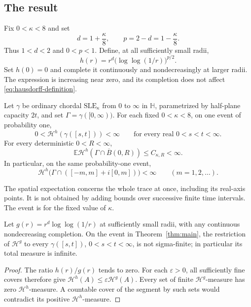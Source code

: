 \subsection{The result}

Fix $0<\kappa<8$ and set
\begin{equation}\label{eq:parameters}
 d=1+\frac\kappa8,\qquad p=2-d=1-\frac\kappa8.
\end{equation}
Thus $1<d<2$ and $0<p<1$. Define, at all sufficiently small radii,
\begin{equation}\label{eq:gauge}
 h(r)=r^d\bigl(\log\log(1/r)\bigr)^{p/2}.
\end{equation}
Set $h(0)=0$ and complete it continuously and nondecreasingly at
larger radii. The expression is increasing near zero, and its
completion does not affect \eqref{eq:hausdorff-definition}.

\begin{theorem}\label{thm:main}
Let $\gamma$ be ordinary chordal $\mathrm{SLE}_\kappa$ from $0$ to
$\infty$ in $\mathbb H$, parametrized by half-plane capacity $2t$,
and set $\Gamma=\gamma([0,\infty))$. For each fixed $0<\kappa<8$,
on one event of probability one,
\[
 0<\mathcal H^h(\gamma([s,t]))<\infty
 \qquad\text{for every real }0<s<t<\infty.
\]
For every deterministic $0<R<\infty$,
\[
 \mathbb E\mathcal H^h(\Gamma\cap\overline B(0,R))
       \le C_{\kappa,R}<\infty.
\]
In particular, on the same probability-one event,
\[
 \mathcal H^h\bigl(\Gamma\cap([-m,m]+i[0,m])\bigr)<\infty
 \qquad(m=1,2,\ldots).
\]
\end{theorem}

The spatial expectation concerns the whole trace at once, including
its real-axis points. It is not obtained by adding bounds over
successive finite time intervals. The event is for the fixed value
of $\kappa$.

\begin{corollary}\label{cor:larger-gauge}
Let $g(r)=r^d\log\log(1/r)$ at sufficiently small radii, with any
continuous nondecreasing completion. On the event in
Theorem~\ref{thm:main}, the restriction of $\mathcal H^g$ to every
$\gamma([s,t])$, $0<s<t<\infty$, is not sigma-finite; in particular
its total measure is infinite.
\end{corollary}
\begin{proof}
The ratio $h(r)/g(r)$ tends to zero. For each $\varepsilon>0$,
all sufficiently fine covers therefore give
$\mathcal H^h(A)\le\varepsilon\mathcal H^g(A)$.
Every set of finite $\mathcal H^g$-measure has zero
$\mathcal H^h$-measure. A countable cover of the segment by such sets
would contradict its positive $\mathcal H^h$-measure.
\end{proof}

